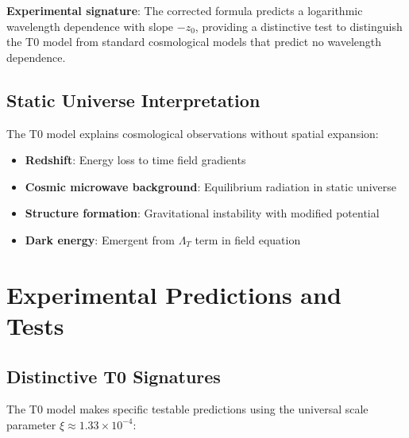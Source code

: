 \documentclass[12pt,a4paper]{article}
\theoremstyle{definition}
\theoremstyle{remark}
\begin{document}
	\textbf{Experimental signature}: The corrected formula predicts a logarithmic wavelength dependence with slope $-z_0$, providing a distinctive test to distinguish the T0 model from standard cosmological models that predict no wavelength dependence.
	
	\subsection{Static Universe Interpretation}
	\label{subsec:static_universe}
	
	The T0 model explains cosmological observations without spatial expansion:
	\begin{itemize}
		\item \textbf{Redshift}: Energy loss to time field gradients
		\item \textbf{Cosmic microwave background}: Equilibrium radiation in static universe
		\item \textbf{Structure formation}: Gravitational instability with modified potential
		\item \textbf{Dark energy}: Emergent from $\Lambda_T$ term in field equation
	\end{itemize}
	
	\section{Experimental Predictions and Tests}
	\label{sec:experimental_predictions}
	
	\subsection{Distinctive T0 Signatures}
	\label{subsec:distinctive_signatures}
	
	The T0 model makes specific testable predictions using the universal scale parameter $\xi \approx 1.33 \times 10^{-4}$:
	
\end{document}

